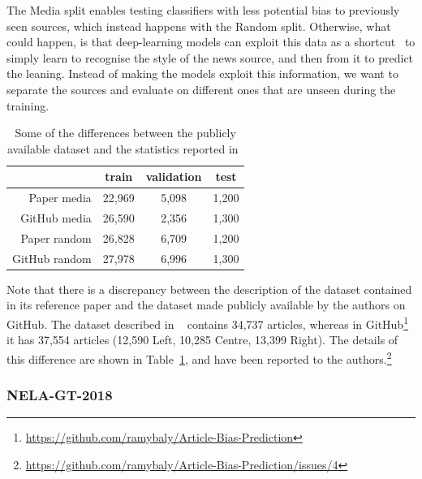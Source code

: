 The Media split enables testing classifiers with less potential bias to previously seen sources, which instead happens with the Random split.
Otherwise, what could happen, is that deep-learning models can exploit this data as a shortcut~\citep{geirhos2020shortcut,baly2020we} to simply learn to recognise the style of the news source, and then from it to predict the leaning.
Instead of making the models exploit this information, we want to separate the sources and evaluate on different ones that are unseen during the training.

\begin{table}[!htbp]
   \centering
   \begin{tabular}{r|c|c|c}
       & train & validation & test \\
       \hline
       Paper media & 22,969 & 5,098 & 1,200 \\
       GitHub media & 26,590 & 2,356 & 1,300 \\
       \hline
       Paper random & 26,828 & 6,709 & 1,200 \\
       GitHub random & 27,978 & 6,996 & 1,300
   \end{tabular}
   \caption{Some of the differences between the publicly available dataset and the statistics reported in~\citet{baly2020we}}
   \label{tab:baly_size}
\end{table}

Note that there is a discrepancy between the description of the dataset contained in its reference paper and the dataset made publicly available by the authors on GitHub.
The dataset described in ~\citet{baly2020we} contains 34,737 articles, whereas in GitHub\footnote{\url{https://github.com/ramybaly/Article-Bias-Prediction}} it has 37,554 articles (12,590 Left, 10,285 Centre, 13,399 Right). The details of this difference are shown in Table~\ref{tab:baly_size}, and have been reported to the authors.\footnote{\url{https://github.com/ramybaly/Article-Bias-Prediction/issues/4}}

\subsubsection{NELA-GT-2018}

